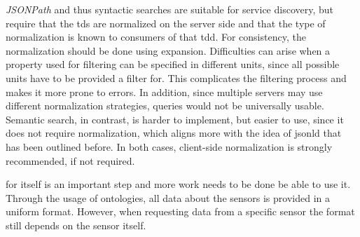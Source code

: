 \emph{JSONPath} and thus syntactic searches are suitable for service discovery, but require that the \glspl{td} are normalized on the server side and that the type of normalization is known to consumers of that \gls{tdd}. For consistency, the normalization should be done using expansion. Difficulties can arise when a property used for filtering can be specified in different units, since all possible units have to be provided a filter for. This complicates the filtering process and makes it more prone to errors. In addition, since multiple servers may use different normalization strategies, queries would not be universally usable. Semantic search, in contrast, is harder to implement, but easier to use, since it does not require normalization, which aligns more with the idea of \gls{jsonld} that has been outlined before. In both cases, client-side normalization is strongly recommended, if not required.

 for  itself is an important step and more work needs to be done be able to use it. Through the usage of ontologies, all data about the sensors is provided in a uniform format. However, when requesting data from a specific sensor the format still depends on the sensor itself.
